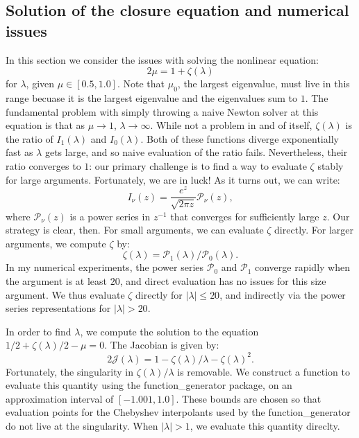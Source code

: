 \documentclass{article}
\begin{document}
\subsection{Solution of the closure equation and numerical issues}

In this section we consider the issues with solving the nonlinear equation:
\begin{equation}
    2\mu = 1 + \zeta(\lambda)
    \label{eqn:bingham_nonlinear}
\end{equation}
for $\lambda$, given $\mu\in[0.5,1.0]$. Note that $\mu_0$, the largest eigenvalue, must live in this range becuase it is the largest eigenvalue and the eigenvalues sum to $1$. The fundamental problem with simply throwing a naive Newton solver at this equation is that as $\mu\to1$, $\lambda\to\infty$. While not a problem in and of itself, $\zeta(\lambda)$ is the ratio of $I_1(\lambda)$ and $I_0(\lambda)$. Both of these functions diverge exponentially fast as $\lambda$ gets large, and so naive evaluation of the ratio fails. Nevertheless, their ratio converges to $1$: our primary challenge is to find a way to evaluate $\zeta$ stably for large arguments. Fortunately, we are in luck! As it turns out, we can write:
\begin{equation}
    I_\nu(z) = \frac{e^z}{\sqrt{2\pi z}}\mathcal{P}_\nu(z),
\end{equation}
where $\mathcal{P}_\nu(z)$ is a power series in $z^{-1}$ that converges for sufficiently large $z$. Our strategy is clear, then. For small arguments, we can evaluate $\zeta$ directly. For larger arguments, we compute $\zeta$ by:
\begin{equation}
    \zeta(\lambda) = \mathcal{P}_1(\lambda)/\mathcal{P}_0(\lambda).
\end{equation}
In my numerical experiments, the power series $\mathcal{P}_0$ and $\mathcal{P}_1$ converge rapidly when the argument is at least $20$, and direct evaluation has no issues for this size argument. We thus evaluate $\zeta$ directly for $|\lambda|\leq20$, and indirectly via the power series representations for $|\lambda|>20$.

In order to find $\lambda$, we compute the solution to the equation $1/2 + \zeta(\lambda)/2 - \mu = 0$. The Jacobian is given by:
\begin{equation}
    2\mathcal{J}(\lambda) = 1 - \zeta(\lambda)/\lambda - \zeta(\lambda)^2.
\end{equation}
Fortunately, the singularity in $\zeta(\lambda)/\lambda$ is removable. We construct a function to evaluate this quantity using the function\_generator package, on an approximation interval of $[ -1.001, 1.0]$. These bounds are chosen so that evaluation points for the Chebyshev interpolants used by the function\_generator do not live at the singularity. When $|\lambda|>1$, we evaluate this quantity direclty.
\end{document}
